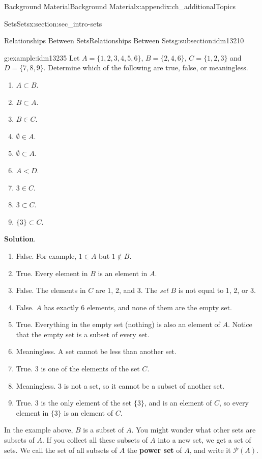 \documentclass[oneside,10pt,]{book}
\newcommand{\terminology}[1]{\textbf{#1}}
\numberwithin{equation}{chapter}
\def\pow{\mathcal P}
\newcommand{\lt}{<}
\begin{document}
\begin{appendixptx}{Background Material}{}{Background Material}{}{}{x:appendix:ch_additionalTopics}
\begin{sectionptx}{Sets}{}{Sets}{}{}{x:section:sec_intro-sets}
\begin{subsectionptx}{Relationships Between Sets}{}{Relationships Between Sets}{}{}{g:subsection:idm13210}
\begin{example}{}{g:example:idm13235}%
Let \(A = \{1, 2, 3, 4, 5, 6\}\), \(B = \{2, 4, 6\}\), \(C = \{1, 2, 3\}\) and \(D = \{7, 8, 9\}\). Determine which of the following are true, false, or meaningless.%
\par
%
\begin{enumerate}
\item{}\(A \subset B\).%
\item{}\(B \subset A\).%
\item{}\(B \in C\).%
\item{}\(\emptyset \in A\).%
\item{}\(\emptyset \subset A\).%
\item{}\(A \lt  D\).%
\item{}\(3 \in C\).%
\item{}\(3 \subset C\).%
\item{}\(\{3\} \subset C\).%
\end{enumerate}
%
\par\smallskip%
\noindent\textbf{Solution}.\hypertarget{g:solution:idm13262}{}\quad{}%
\begin{enumerate}
\item{}False. For example, \(1\in A\) but \(1 \notin B\).%
\item{}True. Every element in \(B\) is an element in \(A\).%
\item{}False. The elements in \(C\) are 1, 2, and 3. The \emph{set} \(B\) is not equal to 1, 2, or 3.%
\item{}False. \(A\) has exactly 6 elements, and none of them are the empty set.%
\item{}True. Everything in the empty set (nothing) is also an element of \(A\). Notice that the empty set is a subset of every set.%
\item{}Meaningless. A set cannot be less than another set.%
\item{}True. \(3\) is one of the elements of the set \(C\).%
\item{}Meaningless. \(3\) is not a set, so it cannot be a subset of another set.%
\item{}True. \(3\) is the only element of the set \(\{3\}\), and is an element of \(C\), so every element in \(\{3\}\) is an element of \(C\).%
\end{enumerate}
%
\end{example}
In the example above, \(B\) is a subset of \(A\). You might wonder what other sets are subsets of \(A\). If you collect all these subsets of \(A\) into a new set, we get a set of sets. We call the set of all subsets of \(A\) the \terminology{power set}  of \(A\), and write it \(\pow(A)\).%

\end{subsectionptx}
\end{sectionptx}
\end{appendixptx}
\end{document}
